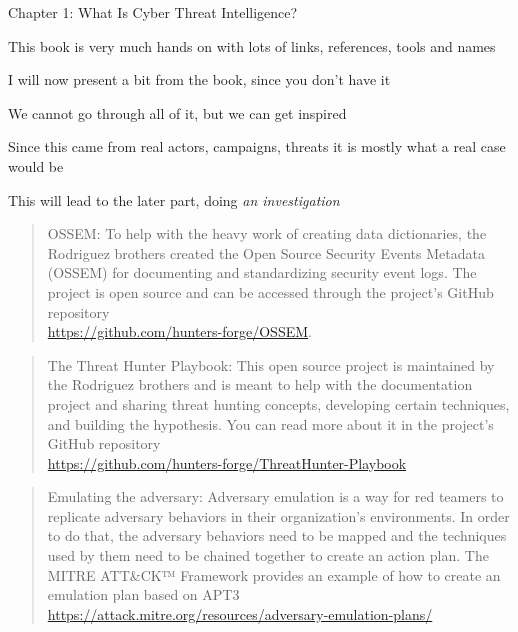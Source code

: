 \documentclass[Screen16to9,17pt]{foils}
\begin{document}
\begin{list2}
\item Chapter 1: What Is Cyber Threat Intelligence?
\item This book is very much hands on with lots of links, references, tools and names
\item I will now present a bit from the book, since you don't have it
\end{list2}



\begin{list2}
\item We cannot go through all of it, but we can get inspired
\item Since this came from real actors, campaigns, threats it is mostly what a real case would be
\end{list2}

This will lead to the later part, doing \emph{an investigation}




\begin{quote}
OSSEM: To help with the heavy work of creating data dictionaries, the Rodriguez
brothers created the Open Source Security Events Metadata (OSSEM) for
documenting and standardizing security event logs. The project is open source and
can be accessed through the project's GitHub repository\\
\url{https://github.com/hunters-forge/OSSEM}.
\end{quote}




\begin{quote}
The Threat Hunter Playbook: This open source project is maintained by the
Rodriguez brothers and is meant to help with the documentation project and
sharing threat hunting concepts, developing certain techniques, and building
the hypothesis. You can read more about it in the project's GitHub repository\\
\url{https://github.com/hunters-forge/ThreatHunter-Playbook}
\end{quote}



\begin{quote}
Emulating the adversary: Adversary emulation is a way for red teamers to
replicate adversary behaviors in their organization's environments. In order to
do that, the adversary behaviors need to be mapped and the techniques used by
them need to be chained together to create an action plan. The MITRE ATT\&CK™
Framework provides an example of how to create an emulation plan based on APT3\\
\url{https://attack.mitre.org/resources/adversary-emulation-plans/}
\end{quote}
\end{document}
